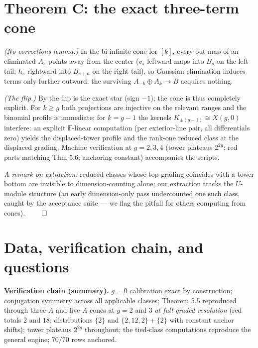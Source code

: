 \documentclass[11pt,reqno]{amsart}
\newcommand{\F}{\mathbb{F}}
\theoremstyle{plain}
\begin{document}
\section{Theorem C: the exact three-term cone}

\emph{(No-corrections lemma.)} In the bi-infinite cone for $[k]$, every out-map of an eliminated $A_s$ points away from the center ($v_s$ leftward maps into $B_s$ on the left tail; $h_s$ rightward into $B_{s+n}$ on the right tail), so Gaussian elimination induces terms only further outward: the surviving $A_{-k}\oplus A_k\to B$ acquires nothing.

\emph{(The flip.)} By \cite{JM} the flip is the exact star (sign $-1$); the cone is thus completely explicit. For $k\ge g$ both projections are injective on the relevant ranges and the binomial profile is immediate; for $k=g-1$ the kernels $K_{\pm(g-1)}\cong X(g,0)$ interfere: an explicit $\F$-linear computation (per exterior-line pair, all differentials zero) yields the displaced-tower profile and the rank-one reduced class at the displaced grading. Machine verification at $g=2,3,4$ (tower plateaus $2^{2g}$; red parts matching Thm 5.6; anchoring constant) accompanies the scripts.

\emph{A remark on extraction:} reduced classes whose top grading coincides with a tower bottom are invisible to dimension-counting alone; our extraction tracks the $U$-module structure (an early dimension-only pass undercounted one such class, caught by the acceptance suite --- we flag the pitfall for others computing from cones). $\qed$

\section{Data, verification chain, and questions}

\noindent\textbf{Verification chain (summary).} $g=0$ calibration exact by construction; conjugation symmetry across all applicable classes; Theorem 5.5 reproduced through three-$A$ and five-$A$ cones at $g=2$ and $3$ \emph{at full graded resolution} (red totals $2$ and $18$; distributions $\{2\}$ and $\{2,12,2\}+\{2\}$ with constant anchor shifts); tower plateaus $2^{2g}$ throughout; the tied-class computations reproduce the general engine; $70/70$ rows anchored.
\end{document}
